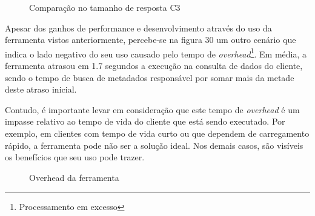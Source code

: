 \begin{figure}[H]
  \centering
  \caption{Comparação no tamanho de resposta C3}
\end{figure}

Apesar dos ganhos de performance e desenvolvimento através do uso da ferramenta vistos anteriormente, percebe-se na figura 30 um outro cenário que indica o lado negativo do seu uso causado pelo tempo de \textit{overhead}\footnote{
  Processamento em excesso
}. Em média, a ferramenta atrasou em 1.7 segundos a execução na consulta de dados do cliente, sendo o tempo de busca de metadados responsável por somar mais da metade deste atraso inicial.

Contudo, é importante levar em consideração que este tempo de \textit{overhead} é um impasse relativo ao tempo de vida do cliente que está sendo executado. Por exemplo, em clientes com tempo de vida curto ou que dependem de carregamento rápido, a ferramenta pode não ser a solução ideal. Nos demais casos, são visíveis os benefícios que seu uso pode trazer.

\begin{figure}[H]
  \centering
  \caption{Overhead da ferramenta}
\end{figure}
